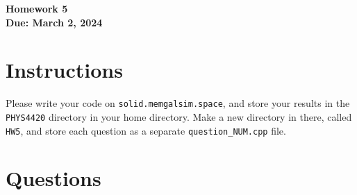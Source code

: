 \documentclass[11pt]{article}
\begin{document}
\begin{center}
\textbf{\Large Homework 5}\\
\textbf{Due: March 2, 2024}\\
\end{center}
\section*{Instructions}
Please write your code on \texttt{solid.memgalsim.space}, and store your results
in the \texttt{PHYS4420} directory in your home directory.  Make a new directory in there, called \texttt{HW5}, and 
store each question as a separate \texttt{question\_NUM.cpp} file.
\section*{Questions}
\end{document}
